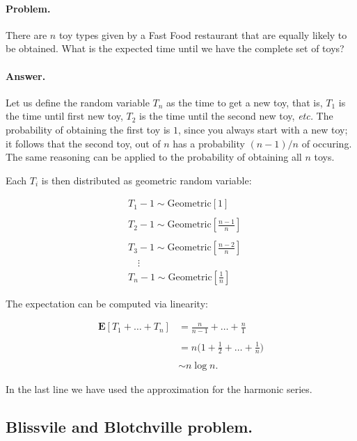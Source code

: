 \documentclass[12pt]{article}
\begin{document}
\paragraph{Problem.}
There are $n$ toy types given by a Fast Food restaurant that are equally likely to be obtained.
What is the expected time until we have the complete set of toys?

\paragraph{Answer.}
Let us define the random variable $T_{n}$ as the time to get a new toy, that is, $T_{1}$ is the time
until first new toy, $T_{2}$ is the time until the second new toy, \textit{etc.}
The probability of obtaining the first toy is $1$, since you always start with a new toy;
it follows that the second toy, out of $n$ has a probability $(n-1)/n$ of occuring. The 
same reasoning can be applied to the probability of obtaining all $n$ toys.

Each $T_{i}$ is then distributed as geometric random variable:

\begin{align}
&T_{1} - 1 \sim \text{Geometric}[1]
\nonumber \\
\nonumber \\
&T_{2} - 1 \sim \text{Geometric}\left[ \frac{n - 1}{n} \right]
\nonumber \\
\nonumber \\
&T_{3} - 1 \sim \text{Geometric}\left[ \frac{n - 2}{n} \right]
\nonumber \\
&\quad \vdots
\nonumber \\
&T_{n} - 1 \sim \text{Geometric}\left[ \frac{1}{n} \right]
\end{align}

The expectation can be computed via linearity:

\begin{align}
\mathbf{E} \left[ T_{1} + \ldots + T_{n} \right] 
&= \frac{n}{n-1} + \ldots + \frac{n}{1}
\nonumber \\
\nonumber \\
&= n \bigg( 1 + \frac{1}{2} + \ldots + \frac{1}{n} \bigg)
\nonumber \\
\nonumber \\
&\sim n \log n .
\end{align}

\noindent
In the last line we have used the approximation for the harmonic series.

\subsection{Blissvile and Blotchville problem.}
\end{document}
